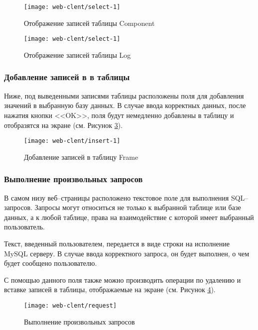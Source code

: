 \begin{figure}[h!]
	\centering
	\texttt{[image: web-clent/select-1]}
	\caption{Отображение записей таблицы Component}
	\label{fig:select-1}
\end{figure}

\begin{figure}[h!]
	\centering
	\texttt{[image: web-clent/select-1]}
	\caption{Отображение записей таблицы Log}
	\label{fig:select-log}
\end{figure}



\subsubsection{Добавление записей в в таблицы}
Ниже, под выведенными записями таблицы расположены поля для добавления значений в выбранную базу данных. В случае ввода корректных данных, после нажатия кнопки <<OK>>, поля будут немедленно добавлены в таблицу и отобразятся на экране (см. Рисунок \ref{fig:insert-1}).

\begin{figure}[h!]
	\centering
	\texttt{[image: web-clent/insert-1]}
	\caption{Добавление записей в таблицу Frame}
	\label{fig:insert-1}
\end{figure}


\subsubsection{Выполнение произвольных запросов}
В самом низу веб--страницы расположено текстовое поле для выполнения SQL--запросов. Запросы могут относиться не только к выбранной таблице или базе данных, а к любой таблице, права на взаимодействие с которой имеет выбранный пользователь. 

Текст, введенный пользователем, передается в виде строки на исполнение MySQL серверу. В случае ввода корректного запроса, он будет выполнен, о чем будет сообщено пользователю. 

С помощью данного поля также можно производить операции по удалению и вставке записей в таблицы, отображаемые на экране (см. Рисунок \ref{fig:request}).

\begin{figure}[h!]
	\centering
	\texttt{[image: web-clent/request]}
	\caption{Выполнение произвольных запросов}
	\label{fig:request}
\end{figure}

